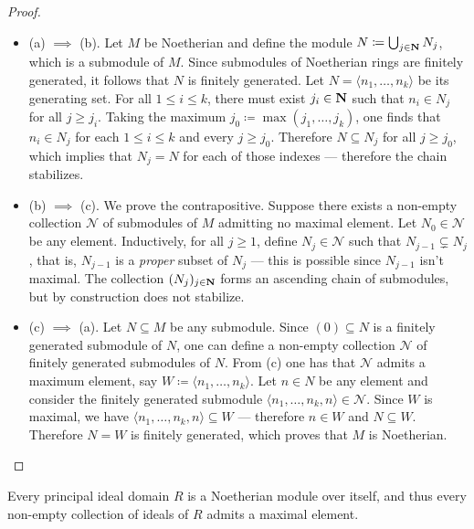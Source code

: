 \begin{proof}
\begin{itemize}\setlength\itemsep{0em}
\item (a) \(\implies\) (b). Let \(M\) be Noetherian and define the module
  \(N \coloneq \bigcup_{j \in \mathbf{N}} N_j\), which is a submodule of \(M\). Since
  submodules of Noetherian rings are finitely generated, it follows that \(N\)
  is finitely generated. Let \(N = \langle n_1, \dots, n_k \rangle\) be its
  generating set. For all \(1 \leq i \leq k\), there must exist \(j_i \in \mathbf{N}\)
  such that \(n_i \in N_j\) for all \(j \geq j_i\). Taking the maximum
  \(j_0 \coloneq \max(j_1, \dots, j_k)\), one finds that \(n_i \in N_j\) for
  each \(1 \leq i \leq k\) and every \(j \geq j_0\). Therefore
  \(N \subseteq N_j\) for all \(j \geq j_0\), which implies that \(N_j = N\) for
  each of those indexes --- therefore the chain stabilizes.

\item (b) \(\implies\) (c). We prove the contrapositive. Suppose there exists a
  non-empty collection \(\mathcal{N}\) of submodules of \(M\) admitting no
  maximal element. Let \(N_0 \in \mathcal{N}\) be any element. Inductively, for
  all \(j \geq 1\), define \(N_j \in \mathcal{N}\) such that \(N_{j-1}
  \subsetneq N_j\), that is, \(N_{j-1}\) is a \emph{proper} subset of \(N_j\)
  --- this is possible since \(N_{j-1}\) isn't maximal. The collection
  \((N_j)_{j \in \mathbf{N}}\) forms an ascending chain of submodules, but by
  construction does not stabilize.

\item (c) \(\implies\) (a). Let \(N \subseteq M\) be any submodule. Since
  \((0) \subseteq N\) is a finitely generated submodule of \(N\), one can define
  a non-empty collection \(\mathcal{N}\) of finitely generated submodules of
  \(N\). From (c) one has that \(\mathcal{N}\) admits a maximum element, say
  \(W \coloneq \langle n_1, \dots, n_k \rangle\). Let \(n \in N\) be any element
  and consider the finitely generated submodule \(\langle n_1, \dots, n_k, n
  \rangle \in \mathcal{N}\). Since \(W\) is maximal, we have \(\langle n_1,
  \dots, n_k, n \rangle \subseteq W\) --- therefore \(n \in W\) and \(N
  \subseteq W\). Therefore \(N = W\) is finitely generated, which proves that
  \(M\) is Noetherian.
\end{itemize}
\end{proof}

\begin{corollary}
\label{cor:pid-is-noetherian}
Every principal ideal domain \(R\) is a Noetherian module over itself, and thus
every non-empty collection of ideals of \(R\) admits a maximal element.
\end{corollary}

